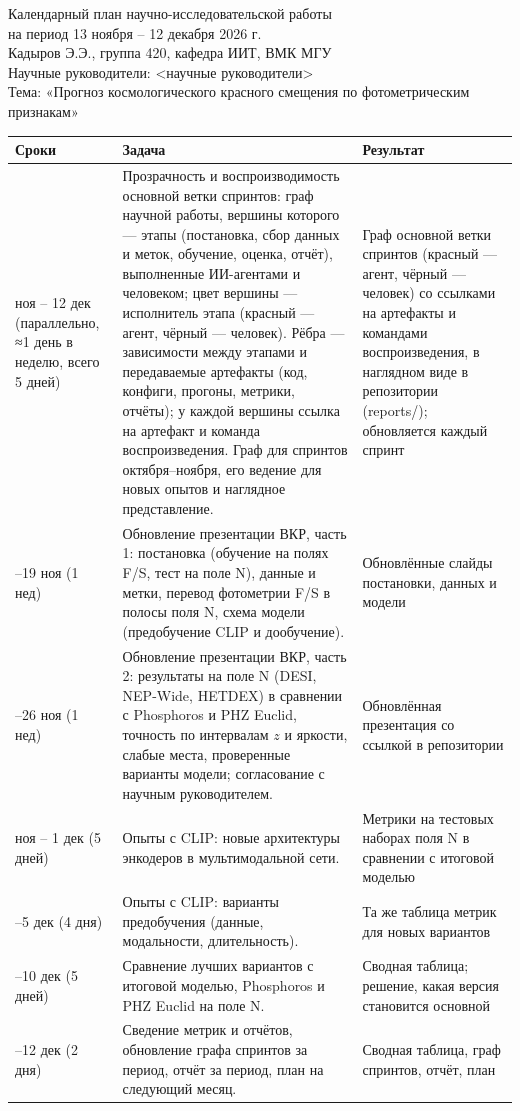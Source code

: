\documentclass[a4paper,11pt]{article}
\begin{document}
\begin{center}
{\Large Календарный план научно-исследовательской работы}\\[4pt]
{\large на период 13 ноября – 12 декабря 2026 г.}\\[8pt]
Кадыров Э.Э., группа 420, кафедра ИИТ, ВМК МГУ\\
Научные руководители: <научные руководители>\\[4pt]
Тема: «Прогноз космологического красного смещения по фотометрическим признакам»
\end{center}

\begin{longtable}{>{\raggedright\arraybackslash}p{2.9cm}>{\raggedright\arraybackslash}p{7.2cm}>{\raggedright\arraybackslash}p{5.2cm}}
\toprule
Сроки & Задача & Результат \\
\midrule
\endhead
13 ноя – 12 дек (параллельно, ≈1 день в неделю, всего 5 дней) &
Прозрачность и воспроизводимость основной ветки спринтов: граф научной работы, вершины которого — этапы (постановка, сбор данных и меток, обучение, оценка, отчёт), выполненные ИИ-агентами и человеком; цвет вершины — исполнитель этапа (красный — агент, чёрный — человек). Рёбра — зависимости между этапами и передаваемые артефакты (код, конфиги, прогоны, метрики, отчёты); у каждой вершины ссылка на артефакт и команда воспроизведения. Граф для спринтов октября–ноября, его ведение для новых опытов и наглядное представление. &
Граф основной ветки спринтов (красный — агент, чёрный — человек) со ссылками на артефакты и командами воспроизведения, в наглядном виде в репозитории (reports/); обновляется каждый спринт \\
13–19 ноя (1 нед) &
Обновление презентации ВКР, часть 1: постановка (обучение на полях F/S, тест на поле N), данные и метки, перевод фотометрии F/S в полосы поля N, схема модели (предобучение CLIP и дообучение). &
Обновлённые слайды постановки, данных и модели \\
20–26 ноя (1 нед) &
Обновление презентации ВКР, часть 2: результаты на поле N (DESI, NEP-Wide, HETDEX) в сравнении с Phosphoros и PHZ Euclid, точность по интервалам $z$ и яркости, слабые места, проверенные варианты модели; согласование с научным руководителем. &
Обновлённая презентация со ссылкой в репозитории \\
27 ноя – 1 дек (5 дней) &
Опыты с CLIP: новые архитектуры энкодеров в мультимодальной сети. &
Метрики на тестовых наборах поля N в сравнении с итоговой моделью \\
2–5 дек (4 дня) &
Опыты с CLIP: варианты предобучения (данные, модальности, длительность). &
Та же таблица метрик для новых вариантов \\
6–10 дек (5 дней) &
Сравнение лучших вариантов с итоговой моделью, Phosphoros и PHZ Euclid на поле N. &
Сводная таблица; решение, какая версия становится основной \\
11–12 дек (2 дня) &
Сведение метрик и отчётов, обновление графа спринтов за период, отчёт за период, план на следующий месяц. &
Сводная таблица, граф спринтов, отчёт, план \\
\bottomrule
\end{longtable}
\end{document}
